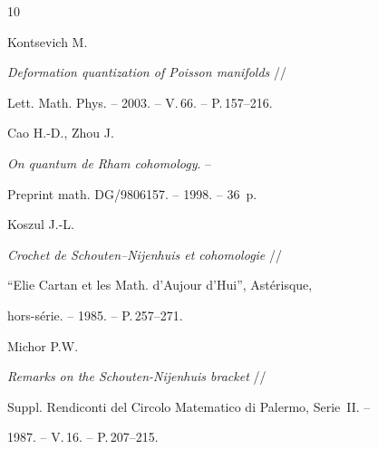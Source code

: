 \begin{thebibliography}{10}


Kontsevich M.


{\it Deformation quantization of Poisson manifolds} //


Lett. Math. Phys. -- 2003. -- V.\,66. -- P.\,157--216.







Cao H.-D., Zhou J.


{\it On quantum de Rham cohomology}. --


Preprint math. DG/9806157. -- 1998. -- 36~p.










Koszul J.-L.


{\it Crochet de Schouten--Nijenhuis et cohomologie} //


``Elie Cartan et les Math. d'Aujour d'Hui'', Ast\'erisque,


hors-s\'erie. -- 1985. -- P.\,257--271.







Michor P.W.


{\it Remarks on the Schouten-Nijenhuis bracket} //


Suppl. Rendiconti del Circolo Matematico di Palermo, Serie~II. --


1987. -- V.\,16. -- P.\,207--215.





\end{thebibliography}





\vskip 2cm












\label{end}














